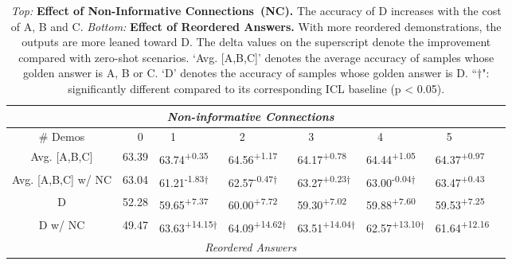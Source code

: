 \documentclass{article} %
\begin{document}
\begin{table}[htbp]
  \small
  \centering
  \caption{\emph{Top:} \textbf{Effect of Non-Informative Connections~(NC).} The accuracy of D increases with the cost of A, B and C. \emph{Bottom: }\textbf{Effect of Reordered Answers.} With more reordered demonstrations, the outputs are more leaned toward D. The delta values on the superscript denote the improvement compared with zero-shot scenarios. `Avg. [A,B,C]' denotes the average accuracy of samples whose golden answer is A, B or C. `D' denotes the accuracy of samples whose golden answer is D. ``$\dagger$": significantly different compared to its corresponding ICL baseline (p < 0.05).}
  \label{tab:undesired}
  \begin{tabular}{c|lllllll}
    \toprule
    \multicolumn{7}{c}{\em Non-informative Connections} \\
    \hline
    \# Demos & ~~ 0 & ~~1 & ~~2 & ~~3 & ~~4 & ~~5 \\
    \hline
    Avg. [A,B,C] & 63.39 &	63.74\textsuperscript{+0.35} & 64.56\textsuperscript{+1.17} & 64.17\textsuperscript{+0.78} & 64.44\textsuperscript{+1.05} & 64.37\textsuperscript{+0.97} \\
    Avg. [A,B,C] w/ NC & 63.04 &	61.21\textsuperscript{-1.83$\dagger$} & 62.57\textsuperscript{-0.47$\dagger$} & 63.27\textsuperscript{+0.23$\dagger$} & 63.00\textsuperscript{-0.04$\dagger$} & 63.47\textsuperscript{+0.43} \\
    \hline
    D & 52.28 &	59.65\textsuperscript{+7.37} & 60.00\textsuperscript{+7.72} & 59.30\textsuperscript{+7.02} & 59.88\textsuperscript{+7.60} & 59.53\textsuperscript{+7.25} \\
    D w/ NC & 49.47 &	63.63\textsuperscript{+14.15$\dagger$} & 64.09\textsuperscript{+14.62$\dagger$} & 63.51\textsuperscript{+14.04$\dagger$} & 62.57\textsuperscript{+13.10$\dagger$} & 61.64\textsuperscript{+12.16} \\
    \midrule
    \multicolumn{7}{c}{\em Reordered Answers} \\
    \hline

\end{tabular}
\end{table}
\end{document}
